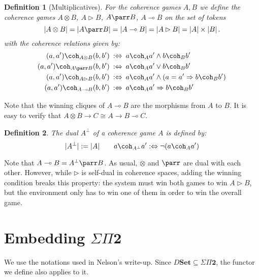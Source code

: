\documentclass{article}
\newtheorem{definition}{Definition}
\begin{document}
\begin{definition}[Multiplicatives]
For the coherence games $A, B$
we define the coherence games
$A \otimes B$, $A \rhd B$, $A \parr B$, $A \multimap B$
on the set of tokens
\[
  |A \otimes B| =
  |A \parr B| =
  |A \multimap B| =
  |A \rhd B| =
  |A| \times |B|
  \,.
\]
with the coherence relations given by:
\begin{align*}
  (a, a') \coh_{A \otimes B} (b, b') &\::\Leftrightarrow\:
    a \coh_A a' \wedge b \coh_B b' \\
  (a, a') \coh_{A \parr B} (b, b') &\::\Leftrightarrow\:
    a \coh_A a' \vee b \coh_B b' \\
  (a, a') \coh_{A \rhd B} (b, b') &\::\Leftrightarrow\:
    a \coh_A a' \wedge (a = a' \Rightarrow b \coh_B b') \\
  (a, a') \coh_{A \multimap B} (b, b') &\::\Leftrightarrow\:
    a \coh_A a' \Rightarrow b \coh_B b'
\end{align*}
\end{definition}

Note that the winning cliques of $A \multimap B$
are the morphisms from $A$ to $B$.
It is easy to verify that
$A \otimes B \rightarrow C \cong A \rightarrow B \multimap C$.

\begin{definition}
The \emph{dual} $A^\bot$ of a coherence game $A$
is defined by:
\[
  |A^\bot| := |A|
  \qquad
  a \coh_{A^\bot} a' :\Leftrightarrow
	  \lnot (a \coh_A a')
\]
\end{definition}

Note that $A \multimap B = A^\bot \parr B$.
As usual, $\otimes$ and $\parr$ are dual with each other.
However,
while $\rhd$ is self-dual in coherence spaces,
adding the winning condition breaks this property:
the system must win both games to win $A \rhd B$,
but the environment only has to win one of them
in order to win the overall game.

\section{Embedding $\Sigma \Pi \mathbf{2}$}

We use the notations used in Nelson's write-up.
Since $D\mathbf{Set} \subseteq \Sigma \Pi \mathbf{2}$,
the functor we define also applies to it.
\end{document}

